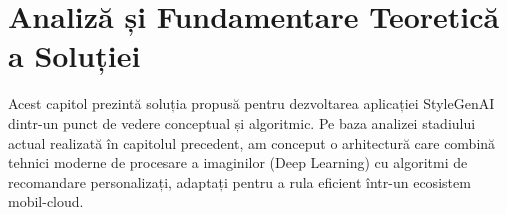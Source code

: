 \chapter{Analiză și Fundamentare Teoretică a Soluției}
\label{cap:fundamentare_teoretica}

Acest capitol prezintă soluția propusă pentru dezvoltarea aplicației StyleGenAI dintr-un punct de vedere conceptual și algoritmic. Pe baza analizei stadiului actual realizată în capitolul precedent, am conceput o arhitectură care combină tehnici moderne de procesare a imaginilor (Deep Learning) cu algoritmi de recomandare personalizați, adaptați pentru a rula eficient într-un ecosistem mobil-cloud.












